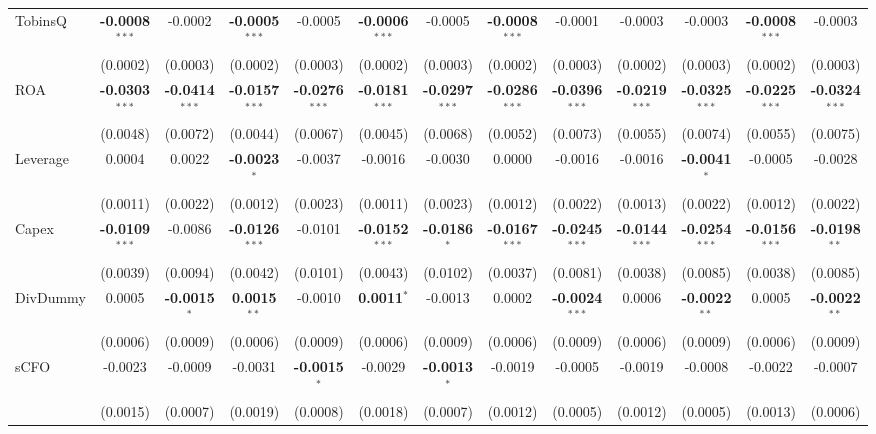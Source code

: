 \documentclass[11pt,a4paper]{article}
\begin{document}
\begin{table}[htbp]
\begin{tabular}{lcccccccccccc}
TobinsQ & \textbf{-0.0008}$^{***}$ & -0.0002 & \textbf{-0.0005}$^{***}$ & -0.0005 & \textbf{-0.0006}$^{***}$ & -0.0005 & \textbf{-0.0008}$^{***}$ & -0.0001 & -0.0003 & -0.0003 & \textbf{-0.0008}$^{***}$ & -0.0003 \\
 & (0.0002) & (0.0003) & (0.0002) & (0.0003) & (0.0002) & (0.0003) & (0.0002) & (0.0003) & (0.0002) & (0.0003) & (0.0002) & (0.0003) \\
ROA & \textbf{-0.0303}$^{***}$ & \textbf{-0.0414}$^{***}$ & \textbf{-0.0157}$^{***}$ & \textbf{-0.0276}$^{***}$ & \textbf{-0.0181}$^{***}$ & \textbf{-0.0297}$^{***}$ & \textbf{-0.0286}$^{***}$ & \textbf{-0.0396}$^{***}$ & \textbf{-0.0219}$^{***}$ & \textbf{-0.0325}$^{***}$ & \textbf{-0.0225}$^{***}$ & \textbf{-0.0324}$^{***}$ \\
 & (0.0048) & (0.0072) & (0.0044) & (0.0067) & (0.0045) & (0.0068) & (0.0052) & (0.0073) & (0.0055) & (0.0074) & (0.0055) & (0.0075) \\
Leverage & 0.0004 & 0.0022 & \textbf{-0.0023}$^{*}$ & -0.0037 & -0.0016 & -0.0030 & 0.0000 & -0.0016 & -0.0016 & \textbf{-0.0041}$^{*}$ & -0.0005 & -0.0028 \\
 & (0.0011) & (0.0022) & (0.0012) & (0.0023) & (0.0011) & (0.0023) & (0.0012) & (0.0022) & (0.0013) & (0.0022) & (0.0012) & (0.0022) \\
Capex & \textbf{-0.0109}$^{***}$ & -0.0086 & \textbf{-0.0126}$^{***}$ & -0.0101 & \textbf{-0.0152}$^{***}$ & \textbf{-0.0186}$^{*}$ & \textbf{-0.0167}$^{***}$ & \textbf{-0.0245}$^{***}$ & \textbf{-0.0144}$^{***}$ & \textbf{-0.0254}$^{***}$ & \textbf{-0.0156}$^{***}$ & \textbf{-0.0198}$^{**}$ \\
 & (0.0039) & (0.0094) & (0.0042) & (0.0101) & (0.0043) & (0.0102) & (0.0037) & (0.0081) & (0.0038) & (0.0085) & (0.0038) & (0.0085) \\
DivDummy & 0.0005 & \textbf{-0.0015}$^{*}$ & \textbf{0.0015}$^{**}$ & -0.0010 & \textbf{0.0011}$^{*}$ & -0.0013 & 0.0002 & \textbf{-0.0024}$^{***}$ & 0.0006 & \textbf{-0.0022}$^{**}$ & 0.0005 & \textbf{-0.0022}$^{**}$ \\
 & (0.0006) & (0.0009) & (0.0006) & (0.0009) & (0.0006) & (0.0009) & (0.0006) & (0.0009) & (0.0006) & (0.0009) & (0.0006) & (0.0009) \\
sCFO & -0.0023 & -0.0009 & -0.0031 & \textbf{-0.0015}$^{*}$ & -0.0029 & \textbf{-0.0013}$^{*}$ & -0.0019 & -0.0005 & -0.0019 & -0.0008 & -0.0022 & -0.0007 \\
 & (0.0015) & (0.0007) & (0.0019) & (0.0008) & (0.0018) & (0.0007) & (0.0012) & (0.0005) & (0.0012) & (0.0005) & (0.0013) & (0.0006) \\

\end{tabular}
\end{table}
\end{document}
